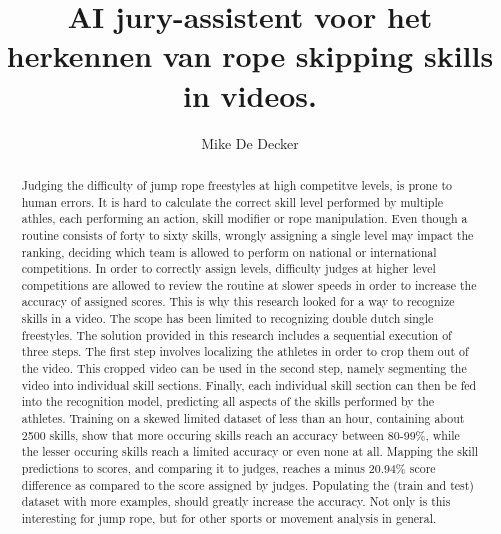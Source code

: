 \documentclass[english,a0,portrait]{hogent-poster}
\title{AI jury-assistent voor het herkennen van rope skipping skills in videos.}
\author{Mike De Decker}
\begin{document}
\maketitle

\begin{abstract}
Judging the difficulty of jump rope freestyles at high competitve levels, is prone to human errors. It is hard to calculate the correct skill level performed by multiple athles, each performing an action, skill modifier or rope manipulation.
Even though a routine consists of forty to sixty skills, wrongly assigning a single level may impact the ranking, deciding which team is allowed to perform on national or international competitions. In order to correctly assign levels, difficulty judges at higher level competitions are allowed to review the routine at slower speeds in order to increase the accuracy of assigned scores.
This is why this research looked for a way to recognize skills in a video. The scope has been limited to recognizing double dutch single freestyles. The solution provided in this research includes a sequential execution of three steps. The first step involves localizing the athletes in order to crop them out of the video. This cropped video can be used in the second step, namely segmenting the video into individual skill sections. Finally, each individual skill section can then be fed into the recognition model, predicting all aspects of the skills performed by the athletes. Training on a skewed limited dataset of less than an hour, containing about 2500 skills, show that more occuring skills reach an accuracy between 80-99\%, while the lesser occuring skills reach a limited accuracy or even none at all. Mapping the skill predictions to scores, and comparing it to judges, reaches a minus 20.94\% score difference as compared to the score assigned by judges. Populating the (train and test) dataset with more examples, should greatly increase the accuracy. Not only is this interesting for jump rope, but for other sports or movement analysis in general.

\end{abstract}
\end{document}
